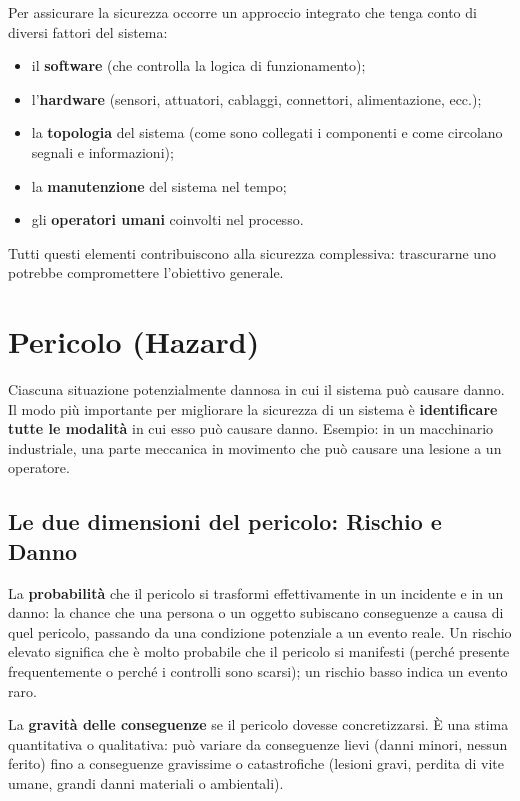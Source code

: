 Per assicurare la sicurezza occorre un approccio integrato che tenga conto di diversi fattori del sistema:
\begin{itemize}
    \item il \textbf{software} (che controlla la logica di funzionamento);
    \item l'\textbf{hardware} (sensori, attuatori, cablaggi, connettori, alimentazione, ecc.);
    \item la \textbf{topologia} del sistema (come sono collegati i componenti e come circolano segnali e informazioni);
    \item la \textbf{manutenzione} del sistema nel tempo;
    \item gli \textbf{operatori umani} coinvolti nel processo.
\end{itemize}
Tutti questi elementi contribuiscono alla sicurezza complessiva: trascurarne uno potrebbe compromettere l'obiettivo generale.

\section{Pericolo (Hazard)}
\begin{defn}
Ciascuna situazione potenzialmente dannosa in cui il sistema può causare danno. Il modo più importante per migliorare la sicurezza di un sistema è \textbf{identificare tutte le modalità} in cui esso può causare danno. Esempio: in un macchinario industriale, una parte meccanica in movimento che può causare una lesione a un operatore.
\end{defn}

\subsection{Le due dimensioni del pericolo: Rischio e Danno}
\begin{defn}[Rischio]
La \textbf{probabilità} che il pericolo si trasformi effettivamente in un incidente e in un danno: la chance che una persona o un oggetto subiscano conseguenze a causa di quel pericolo, passando da una condizione potenziale a un evento reale. Un rischio elevato significa che è molto probabile che il pericolo si manifesti (perché presente frequentemente o perché i controlli sono scarsi); un rischio basso indica un evento raro.
\end{defn}

\begin{defn}[Danno]
La \textbf{gravità delle conseguenze} se il pericolo dovesse concretizzarsi. È una stima quantitativa o qualitativa: può variare da conseguenze lievi (danni minori, nessun ferito) fino a conseguenze gravissime o catastrofiche (lesioni gravi, perdita di vite umane, grandi danni materiali o ambientali).
\end{defn}

